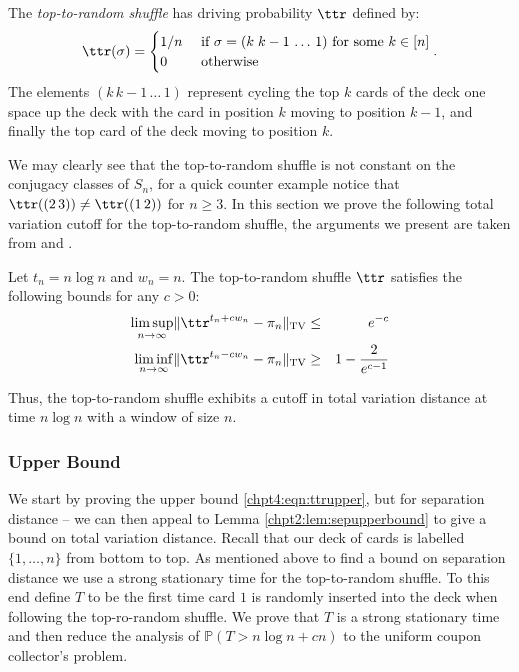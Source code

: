 \documentclass[11pt]{report}
\begin{document}
\begin{defn}
	The \emph{top-to-random shuffle} has driving probability $\ttr$ defined by:
	\[\ttr(\sigma) = \begin{cases}
	1/n & \textnormal{ if } \sigma = (k\hspace{0.1cm} k-1 \, 
	\ldots \, 1)\textnormal{ for some } k\in [n] \\ 
	0 & \textnormal{ otherwise }
	\end{cases}
	.\]
	The elements $(k\, k-1 \, \dots \, 1)$ represent cycling the top $k$ 
	cards of the deck one space up the deck with the card in position $k$ moving to position $k-1$, and finally the top card of the deck moving to position $k$.
\end{defn}
We may clearly see that the top-to-random shuffle is not constant on the 
conjugacy classes of $S_{n}$, for a quick counter example notice that $\ttr( 
(2 \, 3)) \neq \ttr( (1 \, 2))$ for $n\geq 3$. In this section we prove the following total variation cutoff 
for the top-to-random shuffle, the arguments we present are taken from 
\cite[Chapter 4A, Theorem 1]{Diaconis1988} and \cite[Section 6.5.3]{Levin2017}.

\begin{thm}
	\label{chpt4:thm:ttrcutoff}
	Let $t_{n} = n\log n$ and $w_{n} = n$. The top-to-random shuffle $\ttr$ satisfies the following bounds for any $c>0$:
	\begin{eqnarray}
	\limsup_{n\to \infty} \lVert \ttr^{t_{n} + cw_{n}} - \pi_{n} 
	\rVert_{\tiny \textnormal{TV}} & \leq & e^{-c}
	\label{chpt4:eqn:ttrupper}\\ 
	\liminf_{n\to \infty} \lVert \ttr^{t_{n} - cw_{n}} 
	- \pi_{n} 
	\rVert_{\tiny \textnormal{TV}} & \geq &  1 - \frac{2}{e^{c-1}}
	\label{chpt4:eqn:ttrlower}
	\end{eqnarray}
	
	Thus, the top-to-random shuffle exhibits a cutoff in total variation distance at time $n\log n$ with a 
	window of size $n$.
\end{thm}



\subsubsection{Upper Bound}
We start by proving the upper bound \eqref{chpt4:eqn:ttrupper}, but for separation distance -- we can then appeal to
Lemma \ref{chpt2:lem:sepupperbound} to give a bound on total variation 
distance. Recall that our deck of cards is labelled $\{1,\ldots, n\}$ from bottom to top. As mentioned above to find a bound on separation distance we 
use a strong stationary time for the top-to-random shuffle.
To this end define $T$ to be the first time card $1$ is randomly 
inserted into the deck when following the top-ro-random shuffle. We prove that $T$ is a strong stationary time  and then reduce the analysis of $\mathbb{P}(T>n\log n +cn)$ to the uniform coupon collector's problem. 
\end{document}
